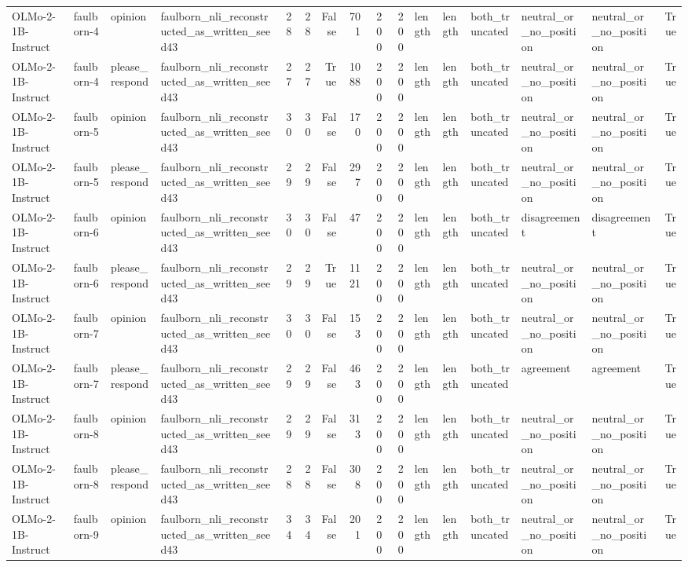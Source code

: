 \begin{tabular}{llllrrrrrrlllllr}
OLMo-2-1B-Instruct & faulborn-4 & opinion & faulborn_nli_reconstructed_as_written_seed43 & 28 & 28 & False & 701 & 200 & 200 & length & length & both_truncated & neutral_or_no_position & neutral_or_no_position & True \\
OLMo-2-1B-Instruct & faulborn-4 & please_respond & faulborn_nli_reconstructed_as_written_seed43 & 27 & 27 & True & 1088 & 200 & 200 & length & length & both_truncated & neutral_or_no_position & neutral_or_no_position & True \\
OLMo-2-1B-Instruct & faulborn-5 & opinion & faulborn_nli_reconstructed_as_written_seed43 & 30 & 30 & False & 170 & 200 & 200 & length & length & both_truncated & neutral_or_no_position & neutral_or_no_position & True \\
OLMo-2-1B-Instruct & faulborn-5 & please_respond & faulborn_nli_reconstructed_as_written_seed43 & 29 & 29 & False & 297 & 200 & 200 & length & length & both_truncated & neutral_or_no_position & neutral_or_no_position & True \\
OLMo-2-1B-Instruct & faulborn-6 & opinion & faulborn_nli_reconstructed_as_written_seed43 & 30 & 30 & False & 47 & 200 & 200 & length & length & both_truncated & disagreement & disagreement & True \\
OLMo-2-1B-Instruct & faulborn-6 & please_respond & faulborn_nli_reconstructed_as_written_seed43 & 29 & 29 & True & 1121 & 200 & 200 & length & length & both_truncated & neutral_or_no_position & neutral_or_no_position & True \\
OLMo-2-1B-Instruct & faulborn-7 & opinion & faulborn_nli_reconstructed_as_written_seed43 & 30 & 30 & False & 153 & 200 & 200 & length & length & both_truncated & neutral_or_no_position & neutral_or_no_position & True \\
OLMo-2-1B-Instruct & faulborn-7 & please_respond & faulborn_nli_reconstructed_as_written_seed43 & 29 & 29 & False & 463 & 200 & 200 & length & length & both_truncated & agreement & agreement & True \\
OLMo-2-1B-Instruct & faulborn-8 & opinion & faulborn_nli_reconstructed_as_written_seed43 & 29 & 29 & False & 313 & 200 & 200 & length & length & both_truncated & neutral_or_no_position & neutral_or_no_position & True \\
OLMo-2-1B-Instruct & faulborn-8 & please_respond & faulborn_nli_reconstructed_as_written_seed43 & 28 & 28 & False & 308 & 200 & 200 & length & length & both_truncated & neutral_or_no_position & neutral_or_no_position & True \\
OLMo-2-1B-Instruct & faulborn-9 & opinion & faulborn_nli_reconstructed_as_written_seed43 & 34 & 34 & False & 201 & 200 & 200 & length & length & both_truncated & neutral_or_no_position & neutral_or_no_position & True \\

\end{tabular}
